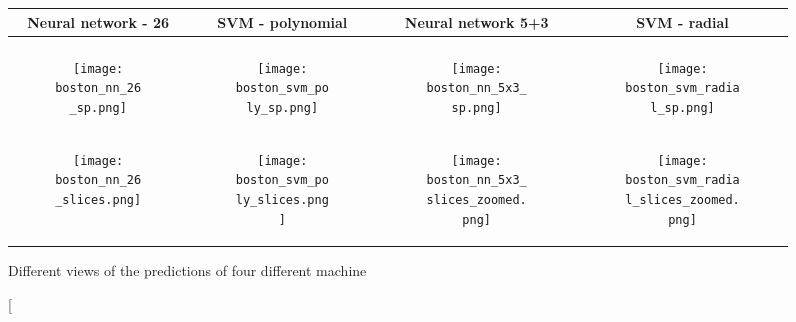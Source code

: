 \begin{figure*}[t]
  \centering
  \begin{tabular}[b]{cccc}
    Neural network - 26 & SVM - polynomial & Neural network 5+3 & SVM - radial \\
    \hline \\
    \begin{subfigure}[b]{0.2\textwidth}
      \texttt{[image: boston\_nn\_26\_sp.png]}
      \caption{
      }
      \label{fig:nn_comp:a}
    \end{subfigure}
    &
    \begin{subfigure}[b]{0.2\textwidth}
      \texttt{[image: boston\_svm\_poly\_sp.png]}
      \caption{
      }
      \label{fig:nn_comp:b}
    \end{subfigure}
    &
    \begin{subfigure}[b]{0.2\textwidth}
      \texttt{[image: boston\_nn\_5x3\_sp.png]}
      \caption{
      }
      \label{fig:nn_comp:c}
    \end{subfigure}
    &
    \begin{subfigure}[b]{0.2\textwidth}
      \texttt{[image: boston\_svm\_radial\_sp.png]}
      \caption{
      }
      \label{fig:nn_comp:d}
    \end{subfigure} \\
    \begin{subfigure}[b]{0.2\textwidth}
      \texttt{[image: boston\_nn\_26\_slices.png]}
      \caption{
      }
      \label{fig:nn_slices:e}
    \end{subfigure}
    &
    \begin{subfigure}[b]{0.2\textwidth}
      \texttt{[image: boston\_svm\_poly\_slices.png]}
      \caption{
      }
      \label{fig:nn_slices:f}
    \end{subfigure}
    &
    \begin{subfigure}[b]{0.2\textwidth}
      \texttt{[image: boston\_nn\_5x3\_slices\_zoomed.png]}
      \caption{
      }
      \label{fig:nn_slices:g}
    \end{subfigure}
    &
    \begin{subfigure}[b]{0.2\textwidth}
      \texttt{[image: boston\_svm\_radial\_slices\_zoomed.png]}
      \caption{
      }
      \label{fig:nn_slices:h}
    \end{subfigure}
  \end{tabular}
  \caption[Different views of the predictions of four different machine 

\end{figure*}
